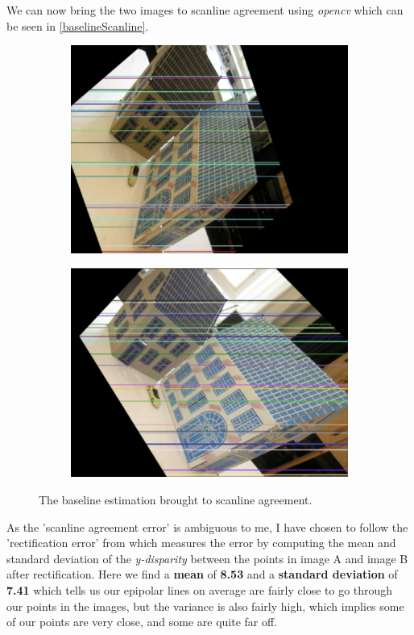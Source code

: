 We can now bring the two images to scanline agreement using \textit{opencv} which can be seen in \autoref{baselineScanline}.
\begin{figure}[h]
	\centering
	\begin{subfigure}{0.48\linewidth}
		\centering
		\includegraphics[width=\linewidth]{Materials/BaselineScanlineA}
	\end{subfigure}
	\begin{subfigure}{0.48\linewidth}
		\centering
		\includegraphics[width=\linewidth]{Materials/BaselineScanlineB}
	\end{subfigure}
	\caption{The baseline estimation brought to scanline agreement.}
	\label{baselineScanline}
\end{figure}
As the 'scanline agreement error' is ambiguous to me, I have chosen to follow the 'rectification error' from \cite{rectificationError} which measures the error by computing the mean and standard deviation of the \textit{y-disparity} between the points in image A and image B after rectification. Here we find a \textbf{mean} of \textbf{8.53} and a \textbf{standard deviation} of \textbf{7.41} which tells us our epipolar lines on average are fairly close to go through our points in the images, but the variance is also fairly high, which implies some of our points are very close, and some are quite far off.